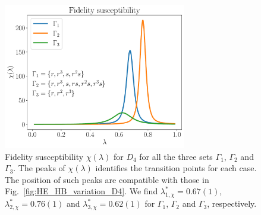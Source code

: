 \begin{figure}[t]
    \centering
    \includegraphics[width=8cm]{assets/graphs/fidelity_susc.pdf}
    \caption[Fidelity susceptibility for $D_4$]{%
        Fidelity susceptibility $\chi(\lambda)$ for $D_4$ for all the three sets $\Gamma_1$, $\Gamma_2$ and $\Gamma_3$.
        The peaks of $\chi(\lambda)$ identifies the transition points for each case.
        The position of such peaks are compatible with those in Fig.~\ref{fig:HE_HB_variation_D4}.
        We find $\lambda_{1, \chi}^*=0.67(1)$, $\lambda_{2, \chi}^*=0.76(1)$ and $\lambda_{3, \chi}^*=0.62(1)$ for $\Gamma_1$, $\Gamma_2$ and $\Gamma_3$, respectively.
    }
    \label{fig:fidelity_D4}
\end{figure}


